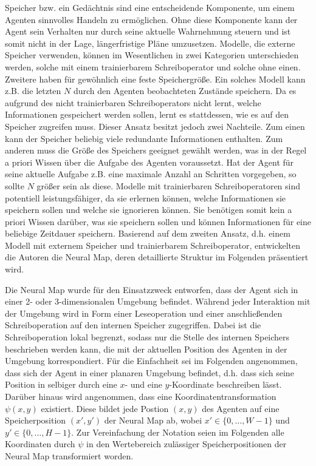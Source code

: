 Speicher bzw. ein Gedächtnis sind eine entscheidende Komponente, um einem Agenten sinnvolles Handeln zu ermöglichen. Ohne diese Komponente kann der Agent sein Verhalten nur durch seine aktuelle Wahrnehmung steuern und ist somit nicht in der Lage, längerfristige Pläne umzusetzen. Modelle, die externe Speicher verwenden, können im Wesentlichen in zwei Kategorien unterschieden werden, solche mit einem trainierbarem Schreiboperator und solche ohne einen. Zweitere haben für gewöhnlich eine feste Speichergröße. Ein solches Modell kann z.B. die letzten $N$ durch den Agenten beobachteten Zustände speichern. Da es aufgrund des nicht trainierbaren Schreiboperators nicht lernt, welche Informationen gespeichert werden sollen, lernt es stattdessen, wie es auf den Speicher zugreifen muss. Dieser Ansatz besitzt jedoch zwei Nachteile. Zum einen kann der Speicher beliebig viele redundante Informationen enthalten. Zum anderen muss die Größe des Speichers geeignet gewählt werden, was in der Regel a priori Wissen über die Aufgabe des Agenten voraussetzt. Hat der Agent für seine aktuelle Aufgabe z.B. eine maximale Anzahl an Schritten vorgegeben, so sollte $N$ größer sein als diese. Modelle mit trainierbaren Schreiboperatoren sind potentiell leistungsfähiger, da sie erlernen können, welche Informationen sie speichern sollen und welche sie ignorieren können. Sie benötigen somit kein a priori Wissen darüber, was sie speichern sollen und können Informationen für eine beliebige Zeitdauer speichern. Basierend auf dem zweiten Ansatz, d.h. einem Modell mit externem Speicher und trainierbarem Schreiboperator, entwickelten die Autoren die Neural Map, deren detaillierte Struktur im Folgenden präsentiert wird.

Die Neural Map wurde für den Einsatzzweck entworfen, dass der Agent sich in einer 2- oder 3-dimensionalen Umgebung befindet. Während jeder Interaktion mit der Umgebung wird in Form einer Leseoperation und einer anschließenden Schreiboperation auf den internen Speicher zugegriffen. Dabei ist die Schreiboperation lokal begrenzt, sodass nur die Stelle des internen Speichers beschrieben werden kann, die mit der aktuellen Position des Agenten in der Umgebung korrespondiert. Für die Einfachheit sei im Folgenden angenommen, dass sich der Agent in einer planaren Umgebung befindet, d.h. dass sich seine Position in selbiger durch eine $x$- und eine $y$-Koordinate beschreiben lässt. Darüber hinaus wird angenommen, dass eine Koordinatentransformation $\psi(x,y)$ existiert. Diese bildet jede Postion $(x,y)$ des Agenten auf eine Speicherposition $(x',y')$ der Neural Map ab, wobei $x' \in \{0, \dots, W-1\}$ und $y' \in \{0, \dots, H-1\}$. Zur Vereinfachung der Notation seien im Folgenden alle Koordinaten durch $\psi$ in den Wertebereich zulässiger Speicherpositionen der Neural Map transformiert worden.

